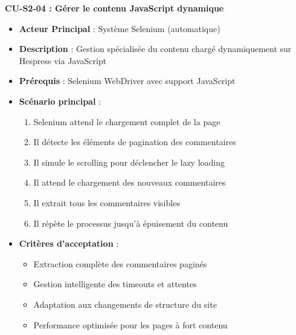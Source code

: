 \textbf{CU-S2-04 : Gérer le contenu JavaScript dynamique}
\begin{itemize}
    \item \textbf{Acteur Principal} : Système Selenium (automatique)
    \item \textbf{Description} : Gestion spécialisée du contenu chargé dynamiquement sur Hespress via JavaScript
    \item \textbf{Prérequis} : Selenium WebDriver avec support JavaScript
    \item \textbf{Scénario principal} :
    \begin{enumerate}
        \item Selenium attend le chargement complet de la page
        \item Il détecte les éléments de pagination des commentaires
        \item Il simule le scrolling pour déclencher le lazy loading
        \item Il attend le chargement des nouveaux commentaires
        \item Il extrait tous les commentaires visibles
        \item Il répète le processus jusqu'à épuisement du contenu
    \end{enumerate}
    \item \textbf{Critères d'acceptation} :
    \begin{itemize}
        \item Extraction complète des commentaires paginés
        \item Gestion intelligente des timeouts et attentes
        \item Adaptation aux changements de structure du site
        \item Performance optimisée pour les pages à fort contenu
    \end{itemize}
\end{itemize}

